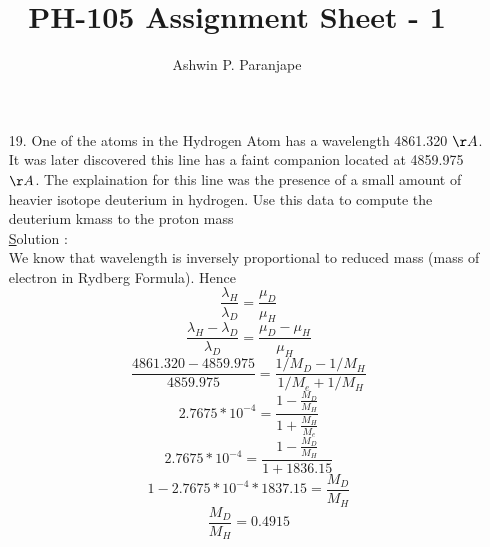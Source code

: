 \documentclass[10pt, a4paper]{article}
\begin{document}
\title{PH-105 Assignment Sheet - 1}
\author{Ashwin P. Paranjape}
\date{}
\maketitle
\begin{enumerate}
\item[19.]{One of the atoms in the Hydrogen Atom has a wavelength 4861.320 $\AA$. It was later discovered this line has a faint companion located at 4859.975 $\AA$. The explaination for this line was the presence of a small amount of heavier isotope deuterium in hydrogen. Use this data to compute the deuterium kmass to the proton mass} \\
{\underline Solution} : \\
We know that wavelength is inversely proportional to reduced mass (mass of electron in Rydberg Formula). Hence
\[\frac{\lambda_H}{\lambda_D}= {\frac{\mu_D}{\mu_H}}\]
\[\frac{\lambda_H - \lambda_D}{\lambda_D} = \frac{\mu_D-\mu_H}{\mu_H}\]
\[\frac{4861.320 - 4859.975}{4859.975}=\frac{1/M_D-1/M_H}{1/M_e+1/M_H}\]
\[2.7675 * 10^{-4} = \frac{1-\frac{M_D}{M_H}}{1+\frac{M_H}{M_e}}\]
\[2.7675 * 10^{-4} = \frac{1-\frac{M_D}{M_H}}{1+1836.15}\]
\[1- 2.7675 * 10^{-4}* 1837.15 = \frac{M_D}{M_H}\]
\[\frac{M_D}{M_H}=0.4915\]

\end{enumerate}
\end{document}
